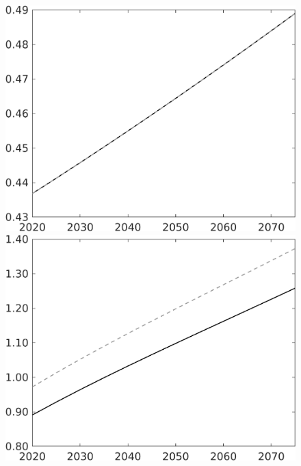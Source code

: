 \documentclass[12pt]{article}
\begin{document}
\begin{figure}[h!!]
\begin{minipage}[]{0.32\textwidth}
	\end{minipage}
	\begin{minipage}[]{0.32\textwidth}
		\includegraphics[width=1\textwidth]{../../codding_model/own_basedOnFried/optimalPol_010922_revision/figures/all_13Sept22/CompTaul_Equlab_LFBAU_Reg0_EY_spillover0_nsk0_xgr1_knspil1_sep1_countec0_GovRev0_etaa0.79_lgd0.png}
	\end{minipage}	
	\begin{minipage}[]{0.32\textwidth}
		\includegraphics[width=1\textwidth]{../../codding_model/own_basedOnFried/optimalPol_010922_revision/figures/all_13Sept22/CompTaul_Equlab_LFBAU_Reg0_N_spillover0_nsk0_xgr1_knspil1_sep1_countec0_GovRev0_etaa0.79_lgd0.png}

\end{minipage}
\end{figure}
\end{document}
